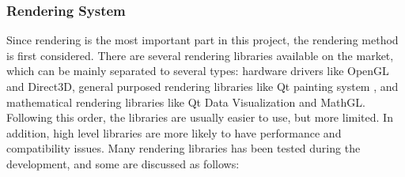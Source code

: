\subsubsection{Rendering System} \label{sec:render}

Since rendering is the most important part in this project, the rendering method is first considered. There are several rendering libraries available on the market, which can be mainly separated to several types: hardware drivers like OpenGL \cite{ref:opengl} and Direct3D\cite{ref:d3d}, general purposed rendering libraries like Qt painting system \cite{ref:qt}, and mathematical rendering libraries like Qt Data Visualization \cite{ref:qtdv} and MathGL\cite{ref:mathgl}. Following this order, the libraries are usually easier to use, but more limited. In addition, high level libraries are more likely to have performance and compatibility issues. Many rendering libraries has been tested during the development, and some are discussed as follows:

